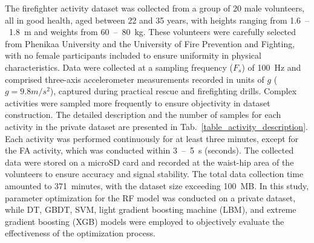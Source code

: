\documentclass[journal,twoside,web]{ieeecolor}
\begin{document}
The firefighter activity dataset was collected from a group of 20 male volunteers, all in good health, aged between 22 and 35 years, with heights ranging from 1.6~--~1.8~m and weights from 60~--~80~kg. These volunteers were carefully selected from Phenikaa University and the University of Fire Prevention and Fighting, with no female participants included to ensure uniformity in physical characteristics. Data were collected at a sampling frequency ($F_s$) of 100~Hz and comprised three-axis accelerometer measurements recorded in units of $g$ ($g = 9.8m/s^2$), captured during practical rescue and firefighting drills. Complex activities were sampled more frequently to ensure objectivity in dataset construction. The detailed description and the number of samples for each activity in the private dataset are presented in Tab.~\ref{table_activity_description}. Each activity was performed continuously for at least three minutes, except for the FA activity, which was conducted within 3~--~5~s (seconds). The collected data were stored on a microSD card and recorded at the waist-hip area of the volunteers to ensure accuracy and signal stability. The total data collection time amounted to 371~minutes, with the dataset size exceeding 100~MB. In this study, parameter optimization for the RF model was conducted on a private dataset, while DT, GBDT, SVM, light gradient boosting machine (LBM), and extreme gradient boosting (XGB) models were employed to objectively evaluate the effectiveness of the optimization process.
\end{document}
